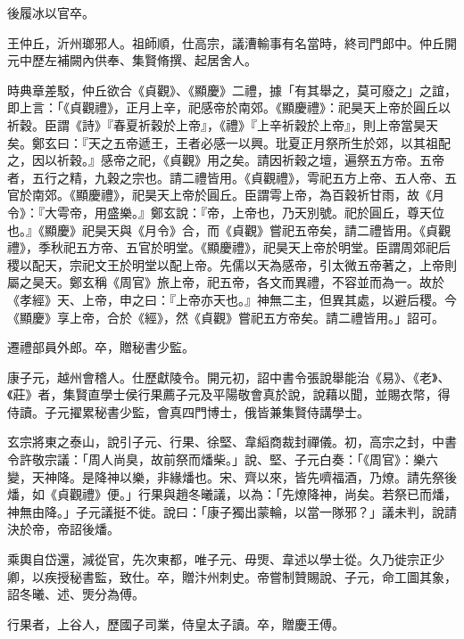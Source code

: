 \begin{pinyinscope}
 後履冰以官卒。



 王仲丘，沂州瑯邪人。祖師順，仕高宗，議漕輸事有名當時，終司門郎中。仲丘開元中歷左補闕內供奉、集賢脩撰、起居舍人。



 時典章差駁，仲丘欲合《貞觀》、《顯慶》二禮，據「有其舉之，莫可廢之」之誼，即上言：「《貞觀禮》，正月上辛，祀感帝於南郊。《顯慶禮》：祀昊天上帝於圓丘以祈穀。臣謂《詩》『春夏祈穀於上帝』，《禮》『上辛祈穀於上帝』，則上帝當昊天矣。鄭玄曰：『天之五帝遞王，王者必感一以興。玭夏正月祭所生於郊，以其祖配之，因以祈穀。』感帝之祀，《貞觀》用之矣。請因祈穀之壇，遍祭五方帝。五帝者，五行之精，九穀之宗也。請二禮皆用。《貞觀禮》，雩祀五方上帝、五人帝、五官於南郊。《顯慶禮》，祀昊天上帝於圓丘。臣謂雩上帝，為百穀祈甘雨，故《月令》：『大雩帝，用盛樂。』鄭玄說：『帝，上帝也，乃天別號。祀於圓丘，尊天位也。』《顯慶》祀昊天與《月令》合，而《貞觀》嘗祀五帝矣，請二禮皆用。《貞觀禮》，季秋祀五方帝、五官於明堂。《顯慶禮》，祀昊天上帝於明堂。臣謂周郊祀后稷以配天，宗祀文王於明堂以配上帝。先儒以天為感帝，引太微五帝著之，上帝則屬之昊天。鄭玄稱《周官》旅上帝，祀五帝，各文而異禮，不容並而為一。故於《孝經》天、上帝，申之曰：『上帝亦天也。』神無二主，但異其處，以避后稷。今《顯慶》享上帝，合於《經》，然《貞觀》嘗祀五方帝矣。請二禮皆用。」詔可。



 遷禮部員外郎。卒，贈秘書少監。



 康子元，越州會稽人。仕歷獻陵令。開元初，詔中書令張說舉能治《易》、《老》、《莊》者，集賢直學士侯行果薦子元及平陽敬會真於說，說藉以聞，並賜衣幣，得侍讀。子元擢累秘書少監，會真四門博士，俄皆兼集賢侍講學士。



 玄宗將東之泰山，說引子元、行果、徐堅、韋縚商裁封禪儀。初，高宗之封，中書令許敬宗議：「周人尚臭，故前祭而燔柴。」說、堅、子元白奏：「《周官》：樂六變，天神降。是降神以樂，非緣燔也。宋、齊以來，皆先嚌福酒，乃燎。請先祭後燔，如《貞觀禮》便。」行果與趙冬曦議，以為：「先燎降神，尚矣。若祭已而燔，神無由降。」子元議挺不徙。說曰：「康子獨出蒙輪，以當一隊邪？」議未判，說請決於帝，帝詔後燔。



 乘輿自岱還，減從官，先次東都，唯子元、毋煚、韋述以學士從。久乃徙宗正少卿，以疾授秘書監，致仕。卒，贈汴州刺史。帝嘗制贊賜說、子元，命工圖其象，詔冬曦、述、煚分為傅。



 行果者，上谷人，歷國子司業，侍皇太子讀。卒，贈慶王傅。




\end{pinyinscope}
